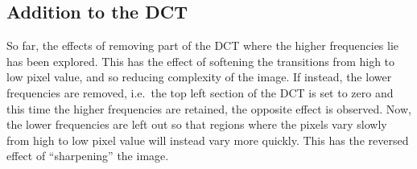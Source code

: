 





\subsection{Addition to the DCT} %
\label{sub:addition_to_the_dct}
So far, the effects of removing part of the DCT where the higher frequencies lie has been explored. This has the effect of softening the transitions from high to low pixel value, and so reducing complexity of the image. If instead, the lower frequencies are removed, i.e.\ the top left section of the DCT is set to zero and this time the higher frequencies are retained, the opposite effect is observed. Now, the lower frequencies are left out so that regions where the pixels vary slowly from high to low pixel value will instead vary more quickly. This has the reversed effect of ``sharpening'' the image.

